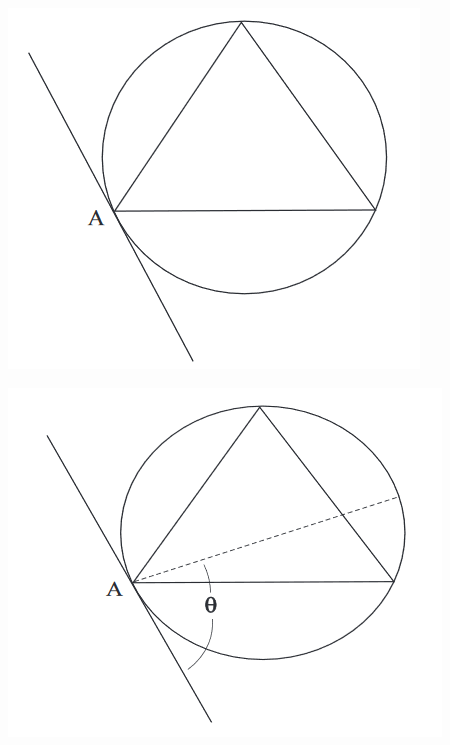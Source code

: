 \documentclass[12pt]{beamer}
\begin{document}
\begin{frame}
  \includegraphics[width=\textwidth]{Bernard_4.png}
\end{frame}
\begin{frame}
  \includegraphics[width=\textwidth]{Bernard_5.png}
\end{frame}
\end{document}

